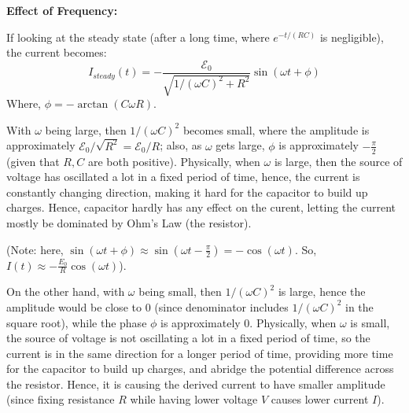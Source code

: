\documentclass{article}
\begin{document}
\hfill

\textbf{Effect of Frequency:}

If looking at the steady state (after a long time, where $e^{-t/(RC)}$ is negligible), the current becomes:
$$I_{steady}(t)=-\frac{\mathcal{E}_0}{\sqrt{1/(\omega C)^2+R^2}}\sin(\omega t+\phi)$$
Where, $\phi=-\arctan(C\omega R)$.

With $\omega$ being large, then $1/(\omega C)^2$ becomes small, where the amplitude is approximately $\mathcal{E}_0/\sqrt{R^2} = \mathcal{E}_0/R$;
also, as $\omega$ gets large, $\phi$ is approximately $-\frac{\pi}{2}$ (given that $R,C$ are both positive). Physically, when $\omega$ is large, then the source of voltage has oscillated a lot in a fixed period of time,
hence, the current is constantly changing direction, making it hard for the capacitor to build up charges.
Hence, capacitor hardly has any effect on the curent, letting the current mostly be dominated by Ohm's Law (the resistor).

(Note: here, $\sin(\omega t+\phi)\approx \sin(\omega t-\frac{\pi}{2}) = -\cos(\omega t)$. So, $I(t)\approx -\frac{E_0}{R}\cos(\omega t)$).

\hfill

On the other hand, with $\omega$ being small, then $1/(\omega C)^2$ is large, hence the amplitude would be close to $0$ (since denominator includes $1/(\omega C)^2$ in the square root), while the phase $\phi$ is approximately $0$.
Physically, when $\omega$ is small, the source of voltage is not oscillating a lot in a fixed period of time, so the current is in the same direction for a longer period of time,
providing more time for the capacitor to build up charges, and abridge the potential difference across the resistor. Hence, it is causing the derived current to have smaller amplitude (since fixing resistance $R$ while having lower voltage $V$ causes lower current $I$).
\end{document}
